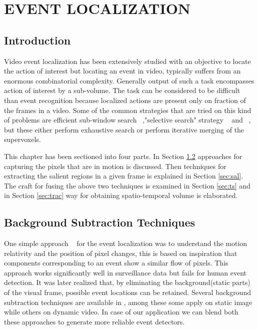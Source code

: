 \chapter{EVENT LOCALIZATION}
 \label{chap:eventLo}
\section{Introduction}
Video event localization has been extensively studied with an objective to locate the action of interest but locating an event in video, typically suffers from an enormous combinatorial complexity.  Generally output of such a task encompasses action of interest by a sub-volume.  The task can be considered to be difficult than event recognition because localized actions are present only on fraction of the frames in a video.  Some of the common strategies that are tried on this kind of problems are efficient sub-window search ~\citep{subwindowsearch},"selective search" strategy ~\citep{selectivesearch}  and ~\cite{tubelet}, but these either perform exhaustive search or perform iterative merging of the supervoxels. 

\par This chapter has been sectioned into four parts.  In Section \ref{sec:bst} approaches for capturing the pixels that are in motion is discussed.  Then techniques for extracting the salient regions in a given frame is explained in Section \ref{sec:sal}.  The craft for fusing the above two techniques is examined in Section \ref{sec:ts} and in Section \ref{sec:trac} way for obtaining spatio-temporal volume is elaborated.

\section{Background Subtraction Techniques} 
 \label{sec:bst}
\par One simple approach ~\citep{Basharat08} for the event localization was to understand the motion relativity and the position of pixel changes, this is based on inspiration that components corresponding to an event show a similar flow of pixels.  This approach works significantly well in surveillance data but fails for human event detection.  It was later realized that, by eliminating the background(static parts) of the visual frame,  possible event locations can be retained.  Several background subtraction techniques are available in \cite{Piccardi04}, among these some apply on static image while others on dynamic video.  In case of our application we can blend both these approaches to generate more reliable event detectors.

